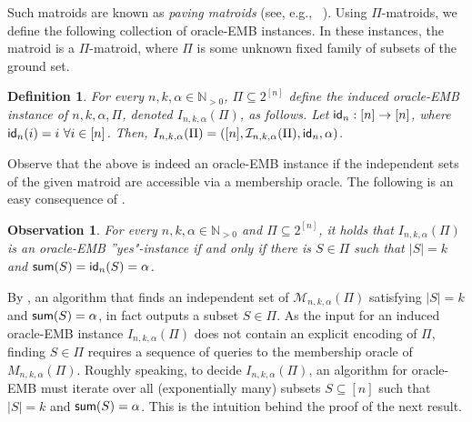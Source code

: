 \documentclass[11pt,letter]{article}
\newcommand{\mm}{M_{n,k,\alpha}(\Pi)}
\newcommand{\cI}{{\mathcal{I}}}
\newtheorem{definition}[lemma]{Definition}
\newtheorem{observation}[lemma]{Observation}
\begin{document}
Such matroids are known as {\em paving matroids} (see, e.g.,~ \cite{Ox2006,PvdP14}).
Using $\Pi$-matroids, we define the following collection of oracle-EMB instances. In these instances, the matroid is a $\Pi$-matroid, 
where $\Pi$ is some unknown fixed family of subsets of the ground set. 
\begin{definition}
	\label{def:EMBpi}
	For every $n,k,\alpha \in \mathbb{N}_{>0}$, $\Pi \subseteq 2^{[n]}$ define the 
	{\em induced} oracle-\textnormal{EMB} instance of $n,k,\alpha,\Pi$, denoted $I_{n,k,\alpha}(\Pi)$, as follows. Let
	$\textnormal{\textsf{id}}_n: [n] \rightarrow [n]$, where $\textnormal{\textsf{id}}_n(i) = i~\forall i \in [n]$. Then, 
	$I_{n,k,\alpha}(\Pi) = ([n],\cI_{n,k,\alpha}(\Pi),\textnormal{\textsf{id}}_n,\alpha)$.
\end{definition}

Observe that the above is indeed an oracle-EMB instance if the independent sets of the given matroid are accessible via a membership oracle. The following is an easy consequence of .

\begin{observation}
	\label{obs:YesNo}
	For every $n,k,\alpha \in \mathbb{N}_{>0}$ and $\Pi \subseteq 2^{[n]}$, it holds that $I_{n,k,\alpha}(\Pi)$ is an \textnormal{oracle-EMB} ''yes"-instance if and only if there is $S \in \Pi$ such that $|S| = k$ and $\textnormal{\textsf{sum}}(S) = \textnormal{\textsf{id}}_n(S) = \alpha$. 
\end{observation}

By , an algorithm that finds an independent set of $\mathcal{M}_{n,k,\alpha}(\Pi)$ satisfying $|S| = k$ and $\textnormal{\textsf{sum}}(S) = \alpha$, %
in fact outputs a subset $S \in \Pi$. 
As the input for an induced oracle-EMB instance $I_{n,k,\alpha}(\Pi)$ does not contain an explicit encoding of $\Pi$, finding $S\in \Pi$ requires a sequence of queries to the membership oracle of $\mm$.  Roughly speaking, to decide $I_{n,k,\alpha}(\Pi)$, 
an algorithm for oracle-EMB must iterate over all (exponentially many) subsets $S \subseteq [n]$ such that $|S| = k$ and $\textnormal{\textsf{sum}}(S) = \alpha$. This is the intuition
behind the proof of the next result.  
%		
\end{document}
